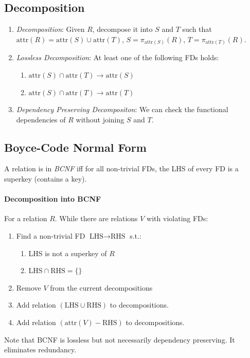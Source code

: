 \documentclass[twocolumn,english]{article}
\begin{document}
\subsection{Decomposition}
\begin{enumerate}
\item \emph{Decomposition}: Given $R$, decompose it into $S$ and $T$
such that $\mbox{attr}\left(R\right)=\mbox{attr}\left(S\right)\cup\mbox{attr}\left(T\right)$,
$S=\pi_{\mbox{attr}\left(S\right)}\left(R\right)$, $T=\pi_{\mbox{attr}\left(T\right)}\left(R\right)$.
\item \emph{Lossless Decomposition}: At least one of the following FDs holds:

\begin{enumerate}
\item $\mbox{attr}\left(S\right)\cap\mbox{attr}\left(T\right)\rightarrow\mbox{attr}\left(S\right)$
\item $\mbox{attr}\left(S\right)\cap\mbox{attr}\left(T\right)\rightarrow\mbox{attr}\left(T\right)$
\end{enumerate}
\item \emph{Dependency Preserving Decompositon}: We can check the functional
dependencies of $R$ without joining $S$ and $T$.
\end{enumerate}

\subsection{Boyce-Code Normal Form}

A relation is in \emph{BCNF} iff for all non-trivial FDs, the LHS
of every FD is a superkey (contains a key).


\paragraph{Decomposition into BCNF}

For a relation $R$. While there are relations $V$ with violating
FDs:
\begin{enumerate}
\item Find a non-trivial FD $\mbox{LHS}\rightarrow\mbox{RHS}$ s.t.:

\begin{enumerate}
\item LHS is not a superkey of $R$
\item $\mbox{LHS}\cap\mbox{RHS}=\{\}$
\end{enumerate}
\item Remove $V$ from the current decompositions
\item Add relation $\left(\mbox{LHS}\cup\mbox{RHS}\right)$ to decompositions.
\item Add relation $\left(\mbox{attr}\left(V\right)-\mbox{RHS}\right)$
to decompositions.
\end{enumerate}
Note that BCNF is lossless but not necessarily dependency preserving.
It eliminates redundancy.
\end{document}
